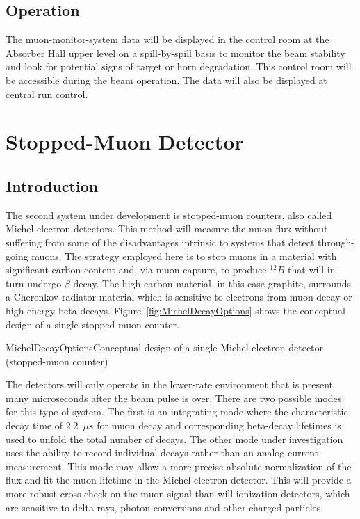 \subsection{Operation}

The muon-monitor-system data will be displayed in the control room 
at the Absorber Hall upper level on
a spill-by-spill basis to monitor the beam stability and look for potential signs of target or horn degradation. 
This control room will be accessible during the beam operation.
The data will also be displayed at central run control.  

%
%
\section{Stopped-Muon Detector} %
\label{sec:nd-blm-stopped-mu}

\subsection{Introduction}

The second system under development is stopped-muon counters, also called
Michel-electron detectors. This method will measure the muon flux without
suffering from some of the disadvantages intrinsic to systems that
detect through-going muons. The strategy employed here is to stop muons
in a material with significant carbon content 
and, via muon capture, to produce $^{12}B$ that will in turn undergo $\beta$ decay.
 The high-carbon material, in this case graphite, surrounds a Cherenkov radiator
material which is sensitive to electrons from muon decay or 
high-energy beta decays.  Figure~\ref{fig:MichelDecayOptions} shows the conceptual design 
of a 
single stopped-muon counter. 


\begin{cdrfigure}{MichelDecayOptions}{Conceptual design of a single Michel-electron detector (stopped-muon counter)}
\end{cdrfigure}

The detectors will only operate in the lower-rate
environment that is present many microseconds after the beam pulse is
over. There are two possible modes for this type of system. 
The first is an integrating mode where the characteristic decay time of 
2.2~$\mu s$ for muon decay and corresponding beta-decay lifetimes is used to
unfold the total number of decays. The other mode under
investigation uses the ability to record individual decays rather
than an analog current measurement. This mode may allow a more precise absolute
normalization of the flux and fit the muon lifetime in the Michel-electron detector. 
This will provide a more robust cross-check on the
muon signal than will ionization detectors, which are sensitive to delta
rays, photon conversions and other charged particles.

